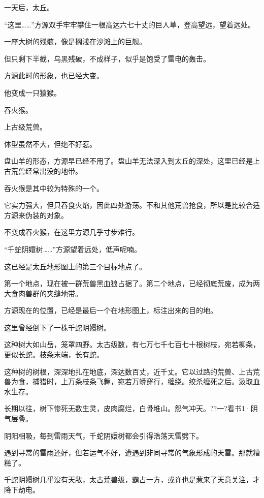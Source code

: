 
\begin{this_body}

一天后，太丘。

“这里……”方源双手牢牢攀住一根高达六七十丈的巨人草，登高望远，望着远处。

一座大树的残骸，像是搁浅在沙滩上的巨舰。

但只剩下半截，乌黑残破，不成样子，似乎是饱受了雷电的轰击。

方源此时的形象，也已经大变。

他变成一只猿猴。

吞火猴。

上古级荒兽。

体型虽然不大，但绝不好惹。

盘山羊的形态，方源早已经不用了。盘山羊无法深入到太丘的深处，这里已经是上古荒兽经常出没的地带。

吞火猴是其中较为特殊的一个。

它实力强大，但只吞食火焰，因此四处游荡。不和其他荒兽抢食，所以是比较合适方源来伪装的对象。

不变成吞火猴，在这里方源几乎寸步难行。

“千蛇阴嬛树……”方源望着远处，低声呢喃。

这已经是太丘地形图上的第三个目标地点了。

第一个地点，现在被一群荒兽黑血狼占据了。第二个地点，已经彻底荒废，成为两大食肉兽群的夹缝地带。

方源现在的位置，已经是最后一个在地形图上，标注出来的目的地。

这里曾经倒下了一株千蛇阴嬛树。

这种树大如山岳，笼罩四野。太古级数，有七万七千七百七十根树枝，宛若柳条，更似长蛇。枝条末端，长有蛇。

这种树的树根，深深地扎在地底，深达数百丈，近千丈。它以过路的荒兽、上古荒兽为食，捕猎时，上万条枝条飞舞，宛若万蟒穿行，缠绕。绞杀缠死之后。汲取血水生存。

长期以往，树下惨死无数生灵，皮肉腐烂，白骨堆山。怨气冲天。??一?看书1·阴气层叠。

阴阳相吸，每到雷雨天气，千蛇阴嬛树都会引得浩荡天雷劈下。

遇到寻常的雷雨还好，但若运气不好，遭遇到非同寻常的气象形成的天雷。那就糟糕了。

千蛇阴嬛树几乎没有天敌，太古荒兽级，霸占一方，或许也是惹来了天意关注，才降下劫电。


\end{this_body}
